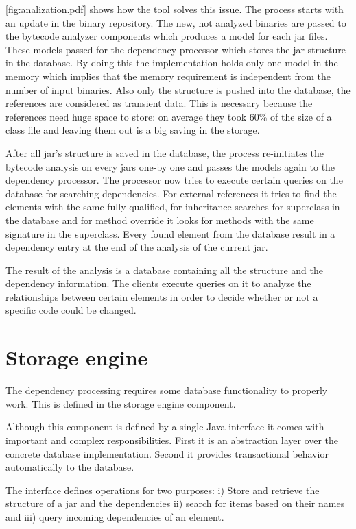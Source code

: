 \autoref{fig:analization.pdf} shows how the tool solves this issue. The process
starts with an update in the binary repository. The new, not analyzed binaries
are passed to the bytecode analyzer components which produces a model for each
jar files. These models passed for the dependency processor which stores the jar
structure in the database. By doing this the implementation holds only one model
in the memory which implies that the memory requirement is independent from the
number of input binaries. Also only the structure is pushed into the database,
the references are considered as transient data. This is necessary because the
references need huge space to store: on average they took 60\% of the size of a
class file and leaving them out is a big saving in the storage.
 
After all jar's  structure is saved in the database, the process re-initiates
the bytecode analysis on every jars one-by one and passes the models again to
the dependency processor. The processor now tries to execute certain queries on
the database for searching dependencies. For external references it tries to
find the elements with the same fully qualified, for inheritance searches for
superclass in the database and for method override it looks for methods with
the same signature in the superclass. Every found element from the database 
result in a dependency entry at the end of the analysis of the current jar. 

The result of the analysis is a database containing all the structure
and the dependency information. The clients execute queries on it to analyze the
relationships between certain elements in order to decide whether or not a
specific code could be changed.
 
 
\section{Storage engine} 
The dependency processing requires some database functionality to 
properly work. This is defined in the storage engine component.

Although this component is defined by a single Java interface it comes with
important and complex responsibilities. First it is an abstraction layer over
the concrete database implementation. Second it provides transactional behavior
automatically to the database. 

The interface defines operations for two purposes: i) Store and retrieve the
structure of a jar and the dependencies ii) search for items based on their
names and iii) query incoming dependencies of an element.


